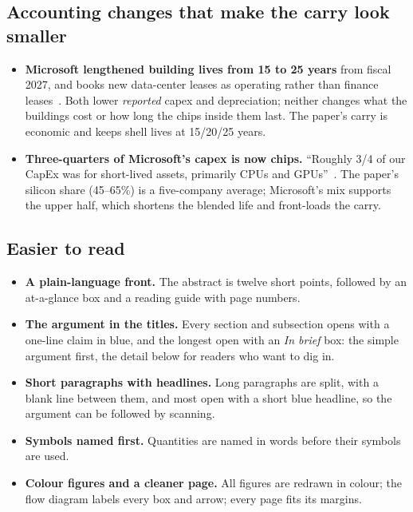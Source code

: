 \documentclass[11pt,letterpaper]{article}
\begin{document}
\subsection*{Accounting changes that make the carry look smaller}\label{ag:acct}
\begin{itemize}
\item \textbf{Microsoft lengthened building lives from 15 to 25 years} from fiscal 2027, and books new data-center leases as operating rather than finance leases~\cite{ref:cfodive_msft}. Both lower \emph{reported} capex and depreciation; neither changes what the buildings cost or how long the chips inside them last. The paper's carry is economic and keeps shell lives at 15/20/25 years.
\item \textbf{Three-quarters of Microsoft's capex is now chips.} ``Roughly 3/4 of our CapEx was for short-lived assets, primarily CPUs and GPUs''~\cite{ref:msft_q1fy27}. The paper's silicon share (45--65\%) is a five-company average; Microsoft's mix supports the upper half, which shortens the blended life and front-loads the carry.
\end{itemize}

\subsection*{Easier to read}\label{ag:read}
\begin{itemize}
\item \textbf{A plain-language front.} The abstract is twelve short points, followed by an at-a-glance box and a reading guide with page numbers.
\item \textbf{The argument in the titles.} Every section and subsection opens with a one-line claim in blue, and the longest open with an \emph{In brief} box: the simple argument first, the detail below for readers who want to dig in.
\item \textbf{Short paragraphs with headlines.} Long paragraphs are split, with a blank line between them, and most open with a short blue headline, so the argument can be followed by scanning.
\item \textbf{Symbols named first.} Quantities are named in words before their symbols are used.
\item \textbf{Colour figures and a cleaner page.} All figures are redrawn in colour; the flow diagram labels every box and arrow; every page fits its margins.
\end{itemize}
\end{document}
